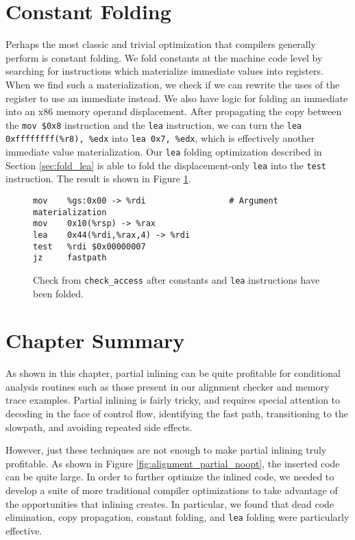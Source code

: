 \section{Constant Folding}

Perhaps the most classic and trivial optimization that compilers generally
perform is constant folding.  We fold constants at the machine code level by
searching for instructions which materialize immediate values into registers.
When we find such a materialization, we check if we can rewrite the uses of the
register to use an immediate instead.  We also have logic for folding an
immediate into an x86 memory operand displacement.  After propagating the copy
between the {\tt mov \$0x8} instruction and the {\tt lea} instruction, we can
turn the {\tt lea 0xffffffff(\%r8), \%edx} into {\tt lea 0x7, \%edx}, which is
effectively another immediate value materialization.  Our {\tt lea} folding
optimization described in Section \ref{sec:fold_lea} is able to fold the
displacement-only {\tt lea} into the {\tt test} instruction.  The result is
shown in Figure \ref{fig:fold_immediate}.

\begin{figure}
\begin{verbatim}
mov    %gs:0x00 -> %rdi                 # Argument materialization
mov    0x10(%rsp) -> %rax
lea    0x44(%rdi,%rax,4) -> %rdi
test   %rdi $0x00000007
jz     fastpath
\end{verbatim}
\caption{Check from {\tt check\_access} after constants and {\tt lea}
instructions have been folded.}
\label{fig:fold_immediate}
\end{figure}

\section{Chapter Summary}

As shown in this chapter, partial inlining can be quite profitable for
conditional analysis routines such as those present in our alignment checker and
memory trace examples.  Partial inlining is fairly tricky, and requires special
attention to decoding in the face of control flow, identifying the fast path,
transitioning to the slowpath, and avoiding repeated side effects.

However, just these techniques are not enough to make partial inlining truly
profitable.  As shown in Figure \ref{fig:alignment_partial_noopt}, the inserted
code can be quite large.  In order to further optimize the inlined code, we
needed to develop a suite of more traditional compiler optimizations to take
advantage of the opportunities that inlining creates.  In particular, we found
that dead code elimination, copy propagation, constant folding, and {\tt lea}
folding were particularly effective.


